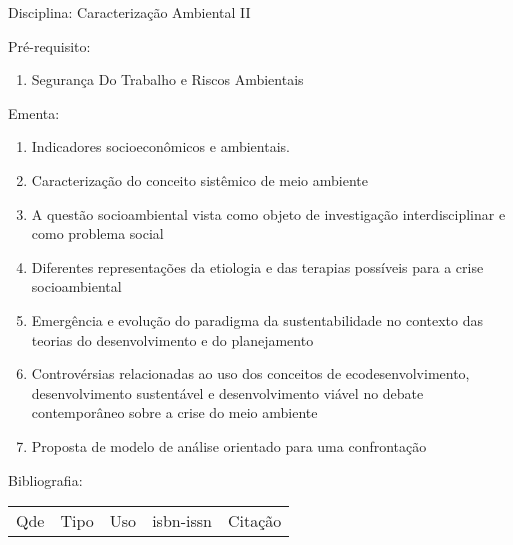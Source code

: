 \documentclass[12pt,a4paper,twoside]{report}
\begin{document}
Disciplina: Caracterização Ambiental II

Pré-requisito:
\begin{enumerate}
\item Segurança Do Trabalho e Riscos Ambientais
\end{enumerate}

Ementa:
\begin{enumerate}
\item Indicadores socioeconômicos e ambientais.
\item Caracterização do conceito sistêmico de meio ambiente
\item A questão socioambiental vista como objeto de investigação interdisciplinar e como problema social
\item Diferentes representações da etiologia e das terapias possíveis para a crise socioambiental
\item Emergência e evolução do paradigma da sustentabilidade no contexto das teorias do desenvolvimento e do planejamento
\item Controvérsias relacionadas ao uso dos conceitos de ecodesenvolvimento, desenvolvimento sustentável e desenvolvimento viável no debate contemporâneo sobre a crise do meio ambiente
\item Proposta de modelo de análise orientado para uma confrontação
\end{enumerate}

Bibliografia:
\begin{tabular}{lllll}
Qde & Tipo & Uso & isbn-issn & Citação \\
\end{tabular}
\end{document}
